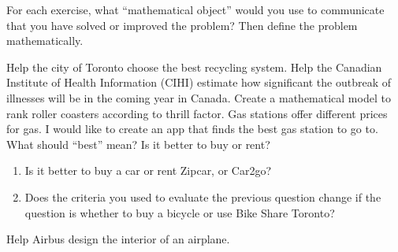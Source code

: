 \begin{exercises}
	For each exercise, what ``mathematical object'' would you use to communicate that you have solved or improved the problem? Then define the problem mathematically.
	\label{exercise:define}
	\begin{problist}
		\prob Help the city of Toronto choose the best recycling system.
		\prob Help the Canadian Institute of Health Information (CIHI) estimate how significant the outbreak of illnesses will be in the coming year in Canada.
		\prob Create a mathematical model to rank roller coasters according to thrill factor.
		\prob Gas stations offer different prices for gas. I would like to create an app that finds the best gas station to go to. What should ``best'' mean?
		\prob Is it better to buy or rent? 
		\begin{enumerate}
			\item Is it better to buy a car or rent Zipcar, or Car2go?
			\item Does the criteria you used to evaluate the previous question change if the question is whether to buy a bicycle or use Bike Share Toronto? 
		\end{enumerate}
		
		\prob Help Airbus design the interior of an airplane.
		
	\end{problist}
\end{exercises}
